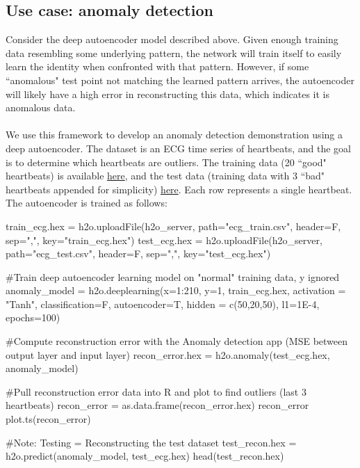 \documentclass[12pt]{article}
\begin{document}
\subsection{Use case: anomaly detection}
Consider the deep autoencoder model described above. Given enough training data resembling some underlying pattern, the network will train itself to easily learn the identity when confronted with that pattern. However, if some ``anomalous" test point not matching the learned pattern arrives, the autoencoder will likely have a high error in reconstructing this data, which indicates it is anomalous data.
\\
\\
We use this framework to develop an anomaly detection demonstration using a deep autoencoder. The dataset is an ECG time series of heartbeats, and the goal is to determine which heartbeats are outliers. The training data (20 ``good" heartbeats) is available \href{https://raw.githubusercontent.com/0xdata/h2o/master/smalldata/anomaly/ecg_discord_train.csv}{here}, and the test data (training data with 3 ``bad" heartbeats appended for simplicity) \href{https://raw.githubusercontent.com/0xdata/h2o/master/smalldata/anomaly/ecg_discord_test.csv}{here}. Each row represents a single heartbeat. The autoencoder is trained as follows: 

\begin{spverbatim}

train_ecg.hex = h2o.uploadFile(h2o_server, path="ecg_train.csv", header=F, sep=",", key="train_ecg.hex") 
test_ecg.hex = h2o.uploadFile(h2o_server, path="ecg_test.csv", header=F, sep=",", key="test_ecg.hex") 

#Train deep autoencoder learning model on "normal" training data, y ignored 
anomaly_model = h2o.deeplearning(x=1:210, y=1, train_ecg.hex, activation = "Tanh", classification=F, autoencoder=T, hidden = c(50,20,50), l1=1E-4, 
epochs=100)                 
                              
#Compute reconstruction error with the Anomaly detection app (MSE between
output layer and input layer)
recon_error.hex = h2o.anomaly(test_ecg.hex, anomaly_model)
                              
#Pull reconstruction error data into R and plot to find outliers (last 3
heartbeats)
recon_error = as.data.frame(recon_error.hex)
recon_error
plot.ts(recon_error)

#Note: Testing = Reconstructing the test dataset
test_recon.hex = h2o.predict(anomaly_model, test_ecg.hex) 
head(test_recon.hex)              

\end{spverbatim}
\noindent
\end{document}
